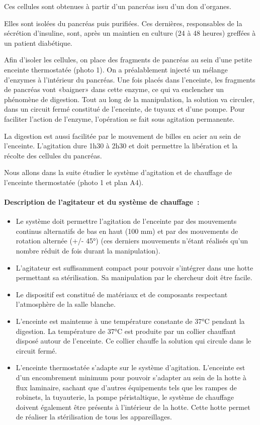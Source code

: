 Ces cellules sont obtenues à partir d'un pancréas issu d'un don
d'organes.

Elles sont isolées du pancréas puis purifiées. Ces dernières,
responsables de la sécrétion d'insuline, sont, après un maintien en
culture (24 à 48 heures) greffées à un patient diabétique.

Afin d'isoler les cellules, on place des fragments de pancréas au sein
d'une petite enceinte thermostatée (photo 1). On a préalablement injecté
un mélange d'enzymes à l'intérieur du pancréas. Une fois placés dans
l'enceinte, les fragments de pancréas vont «baigner» dans cette enzyme,
ce qui va enclencher un phénomène de digestion. Tout au long de la
manipulation, la solution va circuler, dans un circuit fermé constitué
de l'enceinte, de tuyaux et d'une pompe. Pour faciliter l'action de
l'enzyme, l'opération se fait sous agitation permanente.

La digestion est aussi facilitée par le mouvement de billes en acier au
sein de l'enceinte. L'agitation dure 1h30 à 2h30 et doit permettre la
libération et la récolte des cellules du pancréas.

Nous allons dans la suite étudier le système d'agitation et de chauffage
de l'enceinte thermostatée (photo 1 et plan A4).

\paragraph*{Description de l'agitateur et du système de
chauffage~:}\label{description-de-lagitateur-et-du-systuxe8me-de-chauffage}

\begin{itemize}
\item
  Le système doit permettre l'agitation de l'enceinte par des mouvements
  continus alternatifs de bas en haut (100 mm) et par des mouvements de
  rotation alternée (+/- 45°) (ces derniers mouvements n'étant réalisés
  qu'un nombre réduit de fois durant la manipulation).
\item
  L'agitateur est suffisamment compact pour pouvoir s'intégrer dans une
  hotte permettant sa stérilisation. Sa manipulation par le chercheur
  doit être facile.
\item
  Le dispositif est constitué de matériaux et de composants respectant
  l'atmosphère de la salle blanche.
\item
  L'enceinte est maintenue à une température constante de 37°C pendant
  la digestion. La température de 37°C est produite par un collier
  chauffant disposé autour de l'enceinte. Ce collier chauffe la solution
  qui circule dans le circuit fermé.
\item
  L'enceinte thermostatée s'adapte sur le système d'agitation.
  L'enceinte est d'un encombrement minimum pour pouvoir s'adapter au
  sein de la hotte à flux laminaire, sachant que d'autres équipements
  tels que les rampes de robinets, la tuyauterie, la pompe
  péristaltique, le système de chauffage doivent également être présents
  à l'intérieur de la hotte. Cette hotte permet de réaliser la
  stérilisation de tous les appareillages.
\end{itemize}

